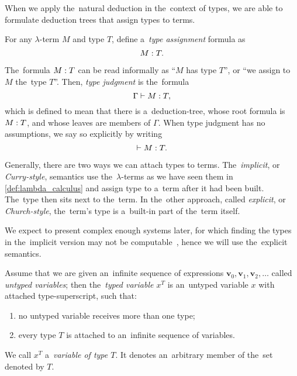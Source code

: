 
When we apply the~natural deduction in the~context of types, we are able to
formulate deduction trees that assign types to terms.

\begin{definition}
  For any $\lambda$-term $M$ and type $T$, define a~\emph{type assignment}
  formula as
  \[
    M \overset{}: T.
  \]
\end{definition}

The~formula $M \overset{}: T$ can be read informally as ``$M$ has type $T$'', or ``we
assign to $M$ the~type $T$''. Then, \emph{type judgment} is the~formula
\[
  \Gamma \vdash M \overset{}: T,
\]
which is defined to mean that there is a~deduction-tree, whose root formula is
$M \overset{}: T$, and whose leaves are members of $\Gamma$. When type judgment has no
assumptions, we say so explicitly by writing
\[
  \vdash M \overset{}: T.
\]

\label{sec:stlc}

Generally, there are two ways we can attach types to terms. The~\emph{implicit},
or \emph{Curry-style}, semantics use the~$\lambda$-terms as we have seen them
in \autoref{def:lambda_calculus} and assign type to a~term after it had been
built. The~type then sits next to the~term. In the~other approach, called
\emph{explicit}, or \emph{Church-style}, the~term's type is a~built-in part of
the~term itself.

We expect to present complex enough systems later, for which finding the types
in the~implicit version may not be computable~\citep{wells_1999}, hence we will
use the~explicit semantics.

\begin{definition}
  Assume that we are given an~infinite sequence of expressions $\mathbf{v}_0,
  \mathbf{v}_1, \mathbf{v}_2, \dots$ called \emph{untyped variables}; then
  the~\emph{typed variable $x^T$} is an~untyped variable $x$ with attached
  type-superscript, such that:
  \begin{enumerate}
    \item \label{def:typed_var:a_item} no untyped variable receives more than
      one type;
    \item \label{def:typed_var:b_item} every type $T$ is attached to an~infinite
      sequence of variables.
  \end{enumerate}
\end{definition}
We call $x^T$ a~\emph{variable of type $T$}. It denotes an~arbitrary member of
the~set denoted by $T$.


